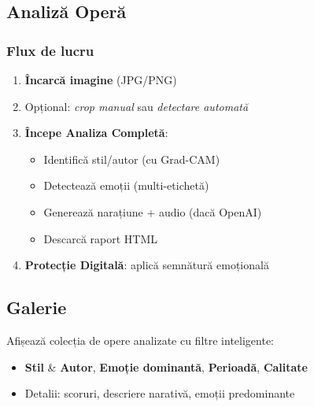 \subsection{Analiză Operă}
\subsubsection{Flux de lucru}
\begin{enumerate}[noitemsep,topsep=2pt]
  \item \textbf{Încarcă imagine} (JPG/PNG)
  \item Opțional: \emph{crop manual} sau \emph{detectare automată}
  \item \textbf{Începe Analiza Completă}:
  \begin{itemize}[noitemsep,topsep=1pt]
    \item Identifică stil/autor (cu Grad-CAM)
    \item Detectează emoții (multi-etichetă)
    \item Generează narațiune + audio (dacă OpenAI)
    \item Descarcă raport HTML
  \end{itemize}
  \item \textbf{Protecție Digitală}: aplică semnătură emoțională
\end{enumerate}




\subsection{Galerie}
Afișează colecția de opere analizate cu filtre inteligente:
\begin{itemize}[noitemsep,topsep=2pt]
  \item \textbf{Stil} \& \textbf{Autor}, \textbf{Emoție dominantă}, \textbf{Perioadă}, \textbf{Calitate}
  \item Detalii: scoruri, descriere narativă, emoții predominante
\end{itemize}


